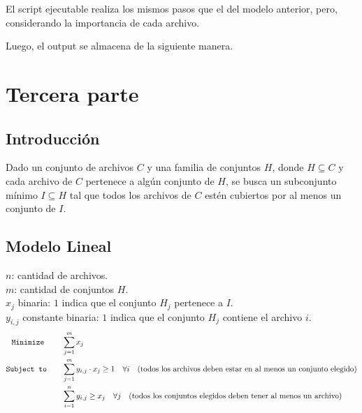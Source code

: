 \documentclass[11pt, a4paper, pdftex]{article}
\begin{document}


\newpage

El script ejecutable realiza los mismos pasos que el del modelo anterior, pero, considerando 
la importancia de cada archivo.



\newpage

Luego, el output se almacena de la siguiente manera.



\section{Tercera parte}

\subsection{Introducción}

Dado un conjunto de archivos \( C \) y una familia de conjuntos \( H \), donde \( H \subseteq C \) y cada archivo de \( C \) pertenece a algún conjunto de \( H \), se busca un subconjunto mínimo \( I \subseteq H \) tal que todos los archivos de \( C \) estén cubiertos por al menos un conjunto de \( I \).

\subsection{Modelo Lineal}

$n$: cantidad de archivos. \\

$m$: cantidad de conjuntos \( H \). \\

$x_{j}$ binaria: $1$ indica que el conjunto \( H_j \) pertenece a \( I \). \\ 

$y_{i,j}$ constante binaria: $1$ indica que el conjunto \( H_j \) contiene el archivo $i$. \\ 

\begin{alignat*}{2}
    \texttt{Minimize}\quad\,\, \quad & \sum_{j = 1}^{m} x_{j}\\
    \texttt{Subject to}\quad \quad & \sum_{j=1}^{m} y_{i,j} \cdot x_j \geq 1 \quad \forall i \quad \text{(todos los archivos deben estar en al menos un conjunto elegido)}\\
    & \sum_{i=1}^{n} y_{i,j} \geq x_j \quad \forall j \quad \text{(todos los conjuntos elegidos deben tener al menos un archivo)}\\
\end{alignat*}
\end{document}
